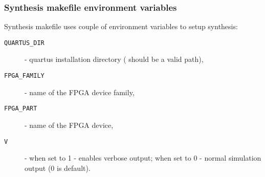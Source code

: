     \subsubsection{Synthesis makefile environment variables}
    \label{sec:syn_make_var}
    
    Synthesis makefile uses couple of environment variables to setup synthesis:
    \begin{description}
    \item[\texttt{QUARTUS\_DIR}] - quartus installation directory ( should be a valid path),
    \item[\texttt{FPGA\_FAMILY}] - name of the FPGA device family,
    \item[\texttt{FPGA\_PART}] - name of the FPGA device,
    \item[\texttt{V}] - when set to 1 - enables verbose output; when set to 0 - normal simulation output (0 is default).
    \end{description}
    